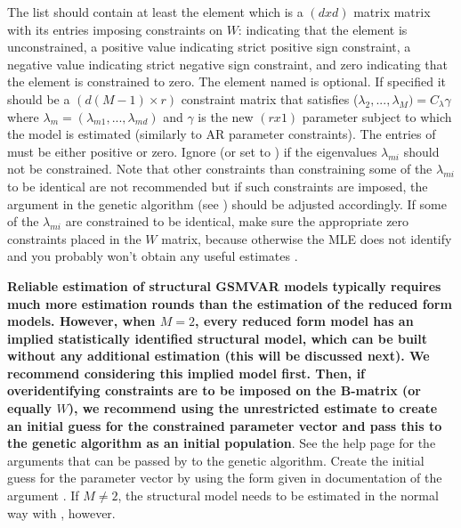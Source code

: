 \documentclass[nojss]{jss} %
\begin{document}
The list  should contain at least the element  which is a $(dxd)$ matrix matrix with its entries imposing constraints on $W$:  indicating that the element is unconstrained, a positive value indicating strict positive sign constraint, a negative value indicating strict negative sign constraint, and zero indicating that the element is constrained to zero. The element named  is optional. If specified it should be a $(d(M-1) \times r)$ constraint matrix that satisfies ($\lambda_{2},...,\lambda_{M}) =C_{\lambda} \gamma$ where $\lambda_{m}=(\lambda_{m1},...,\lambda_{md})$ and $\gamma$ is the new $(r x 1)$ parameter subject to which the model is estimated (similarly to AR parameter constraints). The entries of  must be either positive or zero. Ignore (or set to ) if the eigenvalues $\lambda_{mi}$ should not be constrained. Note that other constraints than constraining some of the $\lambda_{mi}$ to be identical are not recommended but if such constraints are imposed, the argument  in the genetic algorithm (see ) should be adjusted accordingly. If some of the $\lambda_{mi}$ are constrained to be identical, make sure the appropriate zero constraints placed in the $W$ matrix, because otherwise the MLE does not identify and you probably won't obtain any useful estimates \citep[see][Proposition 2]{Virolainen2:2021}.

\textbf{Reliable estimation of structural GSMVAR models typically requires much more estimation rounds than the estimation of the reduced form models. However, when $M=2$, every reduced form model has an implied statistically identified structural model, which can be built without any additional estimation (this will be discussed next). We recommend considering this implied model first. Then, if overidentifying constraints are to be imposed on the B-matrix (or equally $W$), we recommend using the unrestricted estimate to create an initial guess for the constrained parameter vector and pass this to the genetic algorithm as an initial population}. See the help page  for the arguments that can be passed by  to the genetic algorithm. Create the initial guess for the parameter vector by using the form given in documentation of the argument . If $M\neq 2$, the structural model needs to be estimated in the normal way with , however.
\end{document}
